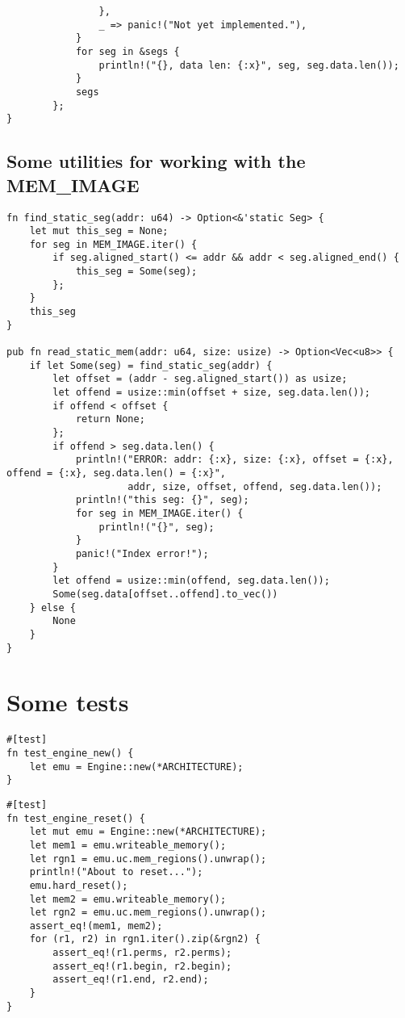\documentclass[11pt]{article}
\begin{document}
\begin{lstlisting}
                },
                _ => panic!("Not yet implemented."),
            }
            for seg in &segs {
                println!("{}, data len: {:x}", seg, seg.data.len());
            }
            segs
        };
}
\end{lstlisting}

\subsection{Some utilities for working with the MEM\_IMAGE}
\label{sec:org15f93b8}

\lstset{language=rust,label=org93ce3cb,caption= ,captionpos=b,numbers=none}
\begin{lstlisting}
fn find_static_seg(addr: u64) -> Option<&'static Seg> {
    let mut this_seg = None;
    for seg in MEM_IMAGE.iter() {
        if seg.aligned_start() <= addr && addr < seg.aligned_end() {
            this_seg = Some(seg);
        };
    }
    this_seg
}

pub fn read_static_mem(addr: u64, size: usize) -> Option<Vec<u8>> {
    if let Some(seg) = find_static_seg(addr) {
        let offset = (addr - seg.aligned_start()) as usize;
        let offend = usize::min(offset + size, seg.data.len());
        if offend < offset {
            return None;
        };
        if offend > seg.data.len() {
            println!("ERROR: addr: {:x}, size: {:x}, offset = {:x}, offend = {:x}, seg.data.len() = {:x}",
                     addr, size, offset, offend, seg.data.len());
            println!("this seg: {}", seg);
            for seg in MEM_IMAGE.iter() {
                println!("{}", seg);
            }
            panic!("Index error!");
        }
        let offend = usize::min(offend, seg.data.len());
        Some(seg.data[offset..offend].to_vec())
    } else {
        None
    }
}
\end{lstlisting}

\section{Some tests}
\label{sec:org77957ec}
\lstset{language=rust,label=org6383a01,caption= ,captionpos=b,numbers=none}
\begin{lstlisting}
#[test]
fn test_engine_new() {
    let emu = Engine::new(*ARCHITECTURE);
}
\end{lstlisting}


\lstset{language=rust,label=org762d3d9,caption= ,captionpos=b,numbers=none}
\begin{lstlisting}
#[test]
fn test_engine_reset() {
    let mut emu = Engine::new(*ARCHITECTURE);
    let mem1 = emu.writeable_memory();
    let rgn1 = emu.uc.mem_regions().unwrap();
    println!("About to reset...");
    emu.hard_reset();
    let mem2 = emu.writeable_memory();
    let rgn2 = emu.uc.mem_regions().unwrap();
    assert_eq!(mem1, mem2);
    for (r1, r2) in rgn1.iter().zip(&rgn2) {
        assert_eq!(r1.perms, r2.perms);
        assert_eq!(r1.begin, r2.begin);
        assert_eq!(r1.end, r2.end);
    }
}
\end{lstlisting}
\end{document}
